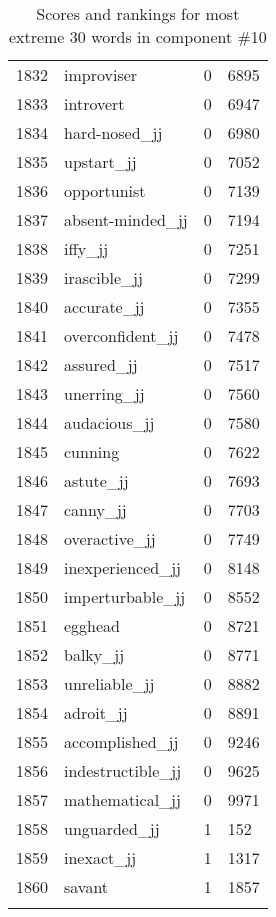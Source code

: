 \begin{longtable}[!htbp]{| rlr@{.}l |}
    1832 & improviser & 0 & 6895 \\
    1833 & introvert & 0 & 6947 \\
    1834 & hard-nosed\_jj & 0 & 6980 \\
    1835 & upstart\_jj & 0 & 7052 \\
    1836 & opportunist & 0 & 7139 \\
    1837 & absent-minded\_jj & 0 & 7194 \\
    1838 & iffy\_jj & 0 & 7251 \\
    1839 & irascible\_jj & 0 & 7299 \\
    1840 & accurate\_jj & 0 & 7355 \\
    1841 & overconfident\_jj & 0 & 7478 \\
    1842 & assured\_jj & 0 & 7517 \\
    1843 & unerring\_jj & 0 & 7560 \\
    1844 & audacious\_jj & 0 & 7580 \\
    1845 & cunning & 0 & 7622 \\
    1846 & astute\_jj & 0 & 7693 \\
    1847 & canny\_jj & 0 & 7703 \\
    1848 & overactive\_jj & 0 & 7749 \\
    1849 & inexperienced\_jj & 0 & 8148 \\
    1850 & imperturbable\_jj & 0 & 8552 \\
    1851 & egghead & 0 & 8721 \\
    1852 & balky\_jj & 0 & 8771 \\
    1853 & unreliable\_jj & 0 & 8882 \\
    1854 & adroit\_jj & 0 & 8891 \\
    1855 & accomplished\_jj & 0 & 9246 \\
    1856 & indestructible\_jj & 0 & 9625 \\
    1857 & mathematical\_jj & 0 & 9971 \\
    1858 & unguarded\_jj & 1 & 152 \\
    1859 & inexact\_jj & 1 & 1317 \\
    1860 & savant & 1 & 1857 \\
    \hline
    \caption{Scores and rankings for most extreme 30 words in component \#10} \\
\end{longtable}
